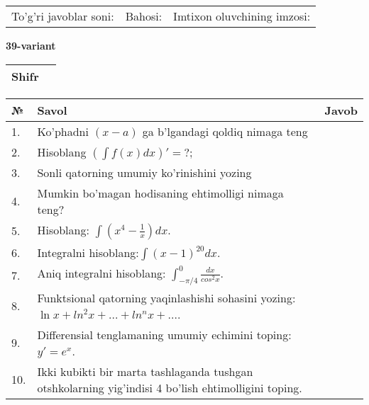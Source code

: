 \documentclass{article}
\begin{document}
  \vspace{1cm}
  
  \begin{tabular}{lll}
  To'g'ri javoblar soni: \underline{\hspace{1.5cm}} & 
  Bahosi: \underline{\hspace{1.5cm}} & 
  Imtixon oluvchining imzosi: \underline{\hspace{2cm}} \\
  \end{tabular}
  
  \egroup
  
  \newpage
  
  
  \textbf{39-variant}\\
  
  \bgroup
  \def\arraystretch{1.6} %
  
  \begin{tabular}{|m{5.7cm}|m{9.5cm}|}
  \hline
  Shifr & \\
  \hline
  \end{tabular}
  
  \vspace{1cm}
  
  \begin{tabular}{|m{0.7cm}|m{10cm}|m{4cm}|}
  \hline
  № & Savol & Javob \\
  \hline
  1. & Ko'phadni \((x - a)\) ga b'lgandagi qoldiq nimaga teng &  \\
  \hline
  2. & Hisoblang \(\left( \int {f(x)dx} \right)' = ?\); &  \\
  \hline
  3. & Sonli qatorning umumiy ko'rinishini yozing &  \\
  \hline
  4. & Mumkin bo'magan hodisaning ehtimolligi nimaga teng? &  \\
  \hline
  5. & Hisoblang: \(\int \left( x^{4} - \frac{1}{x} \right)dx\). &  \\
  \hline
  6. & Integralni hisoblang:\(\int {(x - 1)^{20}}dx\). &  \\
  \hline
  7. & Aniq integralni hisoblang: \(\int_{- \pi/4}^{0}\frac{dx}{cos^{2}x}\). &  \\
  \hline
  8. & Funktsional qatorning yaqinlashishi sohasini yozing: \(\ln x + ln^{2}x + ... + ln^{n}x + ...\). &  \\
  \hline
  9. & Differensial tenglamaning umumiy echimini toping: \(y' = e^{x}\). &  \\
  \hline
  10. & Ikki kubikti bir marta tashlaganda tushgan otshkolarning yig'indisi 4 bo'lish ehtimolligini toping. &  \\
  \hline
  \end{tabular}
  
\end{document}
